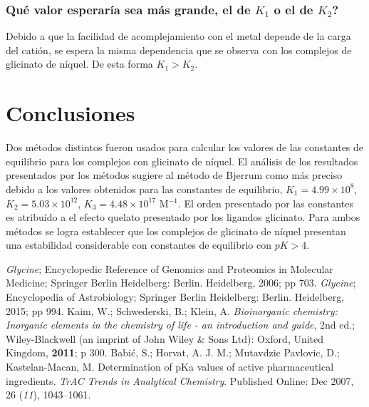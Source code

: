 \documentclass[fleqn,10pt]{SelfArx} %
\begin{document}
	\subsubsection{Qu\'e valor esperar\'ia sea m\'as grande, el de $K_1$ o el de $K_2$?}
	Debido a que la facilidad de acomplejamiento con el metal depende de la carga del cati\'on, se espera la misma dependencia que se observa con los complejos de glicinato de n\'iquel. De esta forma $K_1 > K_2$.
	
	\section{Conclusiones}
	Dos m\'etodos distintos fueron usados para calcular los valores de las constantes de equilibrio para los complejos con glicinato de n\'iquel. El an\'alisis de los resultados presentados por los m\'etodos sugiere al m\'etodo de Bjerrum como m\'as preciso debido a los valores obtenidos para las constantes de equilibrio, $K_1 = 4.99\times10^8$, $K_2 = 5.03\times10^{12}$, $K_3 = 4.48\times10^{17}$ M$^{-1}$. El orden presentado por las constantes es atribu\'ido a el efecto quelato presentado por los ligandos glicinato. Para ambos m\'etodos se logra establecer que los complejos de glicinato de n\'iquel presentan una estabilidad considerable con constantes de equilibrio con $pK > 4$.
	
	
	\begin{thebibliography}{9}
		\textit{Glycine}; Encyclopedic Reference of Genomics and Proteomics in Molecular Medicine; Springer Berlin Heidelberg: Berlin. Heidelberg, 2006; pp 703.
		\textit{Glycine}; Encyclopedia of Astrobiology; Springer Berlin Heidelberg: Berlin. Heidelberg, 2015; pp 994.
		Kaim, W.; Schwederski, B.; Klein, A. \textit{Bioinorganic chemistry: Inorganic elements in the chemistry of life - an introduction and guide}, 2nd ed.; Wiley-Blackwell (an imprint of John Wiley \& Sons Ltd): Oxford, United Kingdom, \textbf{2011}; p 300.
		Babi\'c, S.; Horvat, A. J. M.; Mutavdzic Pavlovic, D.; Kastelan-Macan, M. Determination of pKa values of active pharmaceutical ingredients. \textit{TrAC Trends in Analytical Chemistry}. Published Online: Dec 2007, 26 (\textit{11}), 1043–1061.
	\end{thebibliography}
\end{document}
